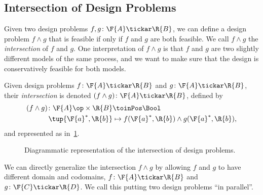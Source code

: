 \subsection{Intersection of Design Problems}
Given two design problems $f, g \colon \F{A} \tickar \R{B}$, we can define a design problem $f \wedge g$ that is feasible if only if $f$ and $g$ are both feasible. We call $f \wedge g$ the \emph{intersection} of $f$ and $g$. One interpretation of $f \wedge g$ is that $f$ and $g$ are two slightly different models of the same process, and we want to make sure that the design is conservatively feasible for both models.

\begin{definition}
Given design problems $f\colon \F{A} \tickar \R{B}$ and $g\colon \F{A} \tickar \R{B}$,
their \emph{intersection} is denoted $(f \wedge g)\colon \F{A} \tickar \R{B}$, defined by
\begin{equation}
	\begin{aligned}
		(f \wedge g)\colon \F{A}\op \times \R{B} & \toinPos \Bool \\
		\tup{\F{a}^*, \R{b}} & \mapsto f(\F{a}^*, \R{b}) \wedge  g(\F{a}^*, \R{b}),
	\end{aligned}
\end{equation}
and represented as in~\cref{fig:intersectiondp}.
\end{definition}
\begin{figure}[h!]
\begin{center}
\end{center}
\caption{Diagrammatic representation of the intersection of design problems. \label{fig:intersectiondp}}
\end{figure}

We can directly generalize the intersection $f \wedge g$ by allowing $f$ and $g$ to have different domain and codomains, $f \colon \F{A} \tickar \R{B}$ and $g \colon \F{C} \tickar \R{D}$. We call this putting two design problems ``in parallel''.

